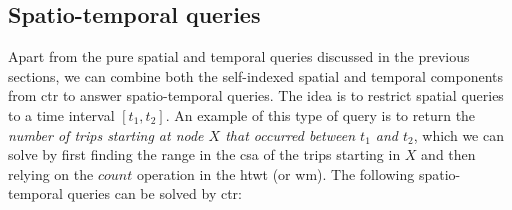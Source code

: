 \begin{itemize}[leftmargin=3mm]
	\end{itemize}

	\subsection{Spatio-temporal queries}
	\label{sec:stq}
	Apart from the pure spatial and temporal queries discussed in the previous sections, %
	we can combine both the self-indexed spatial and temporal components from \gls{ctr} to answer spatio-temporal queries. 
	The idea is to restrict spatial queries to a time interval $[t_1, t_2]$.  An example of this type of query is to return  the
	{\em number of trips starting at node $X$ that occurred between $t_1$ and $t_2$}, which we can solve by first finding the
	range in the \gls{csa} of the trips starting in $X$ and then relying on the  ${count}$
	operation in the \gls{htwt} (or \gls{wm}). The following spatio-temporal queries can be solved by \gls{ctr}:




